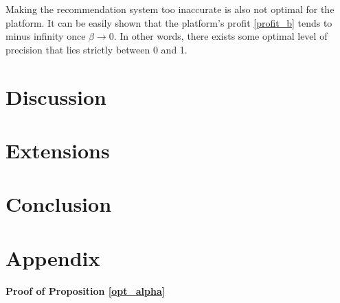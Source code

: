 \documentclass[a4paper]{article}
\begin{document}
Making the recommendation system too inaccurate is also not optimal for the platform. It can be easily shown that the platform's profit \eqref{profit_b} tends to minus infinity once $\beta \to 0$. In other words, there exists some optimal level of precision that lies strictly between 0 and 1.
	\section{Discussion}
	\section{Extensions}
	\section{Conclusion}
	\newpage
\appendix
\section*{Appendix}
	\textbf{Proof of Proposition \ref{opt_alpha}}
\end{document}
